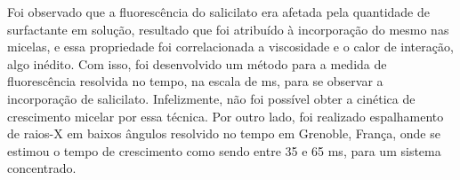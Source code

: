 \documentclass[
	12pt,				%
	openright,			%
	twoside,			%
	a4paper,			%
	english,			%
	brazil%
	]{abntex2}
\begin{document}
\begin{resumo}
	Foi observado que a fluorescência do salicilato era afetada pela quantidade de surfactante em solução, resultado que foi atribuído à incorporação do mesmo nas micelas, e essa propriedade foi correlacionada a viscosidade e o calor de interação, algo inédito. Com isso, foi desenvolvido um método para a medida de fluorescência resolvida no tempo, na escala de ms, para se observar a incorporação de salicilato. Infelizmente, não foi possível obter a cinética de crescimento micelar por essa técnica. Por outro lado, foi realizado espalhamento de raios-X em baixos ângulos resolvido no tempo em Grenoble, França, onde se estimou o tempo de crescimento como sendo entre 35 e 65 ms, para um sistema concentrado.
	
	
\end{resumo}
\end{document}
